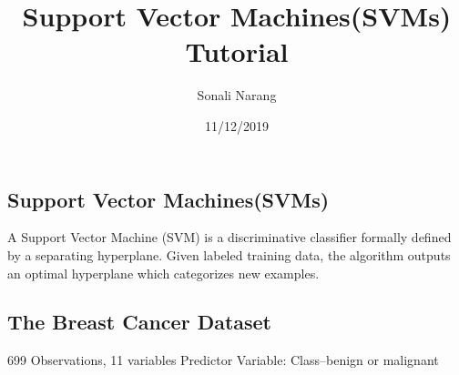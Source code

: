 \documentclass[]{article}
\title{Support Vector Machines(SVMs) Tutorial}
\author{Sonali Narang}
\date{11/12/2019}
\begin{document}
\maketitle

\hypertarget{support-vector-machinessvms}{%
\subsection{Support Vector
Machines(SVMs)}\label{support-vector-machinessvms}}

A Support Vector Machine (SVM) is a discriminative classifier formally
defined by a separating hyperplane. Given labeled training data, the
algorithm outputs an optimal hyperplane which categorizes new examples.

\hypertarget{the-breast-cancer-dataset}{%
\subsection{The Breast Cancer Dataset}\label{the-breast-cancer-dataset}}

699 Observations, 11 variables Predictor Variable: Class--benign or
malignant
\end{document}
